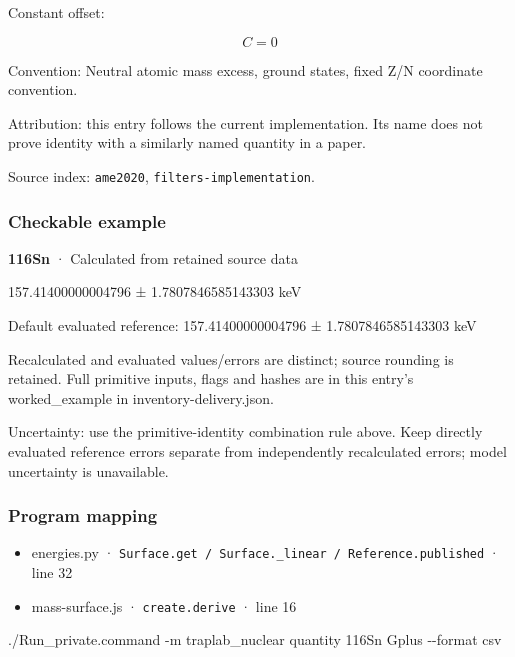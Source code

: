 \documentclass[
  11pt,
  letterpaper,
]{article}
\newenvironment{Shaded}{}{}
\newcommand{\AttributeTok}[1]{\textcolor[rgb]{0.49,0.56,0.16}{#1}}
\newcommand{\ExtensionTok}[1]{#1}
\newcommand{\NormalTok}[1]{#1}
\providecommand{\tightlist}{%
  \setlength{\itemsep}{0pt}\setlength{\parskip}{0pt}}
\begin{document}
Constant offset:

\[
C=0
\]

Convention: Neutral atomic mass excess, ground states, fixed Z/N
coordinate convention.

Attribution: this entry follows the current implementation. Its name
does not prove identity with a similarly named quantity in a paper.

Source index: \texttt{ame2020}, \texttt{filters-implementation}.

\subsubsection{Checkable example}\label{checkable-example-36}

\textbf{116Sn} · Calculated from retained source data

157.41400000004796 ± 1.7807846585143303 keV

Default evaluated reference: 157.41400000004796 ± 1.7807846585143303 keV

Recalculated and evaluated values/errors are distinct; source rounding
is retained. Full primitive inputs, flags and hashes are in this entry's
worked\_example in inventory-delivery.json.

Uncertainty: use the primitive-identity combination rule above. Keep
directly evaluated reference errors separate from independently
recalculated errors; model uncertainty is unavailable.

\subsubsection{Program mapping}\label{program-mapping-36}

\begin{itemize}
\tightlist
\item
  energies.py ·
  \texttt{Surface.get\ /\ Surface.\_linear\ /\ Reference.published} ·
  line 32
\item
  mass-surface.js · \texttt{create.derive} · line 16
\end{itemize}

\begin{Shaded}
\begin{Highlighting}[]
\ExtensionTok{./Run\_private.command} \AttributeTok{{-}m}\NormalTok{ traplab\_nuclear quantity 116Sn Gplus }\AttributeTok{{-}{-}format}\NormalTok{ csv}
\end{Highlighting}
\end{Shaded}
\end{document}
